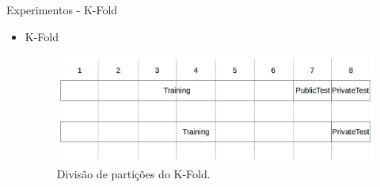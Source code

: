 \begin{frame}{Experimentos - K-Fold}

\begin{itemize}
    \item K-Fold
    
      \begin{figure}
    \centering
    \includegraphics[width=1.0\linewidth]{img/evaluation.png}
    \caption{Divisão de partições do K-Fold.}
  \end{figure}
\end{itemize}

\end{frame}

